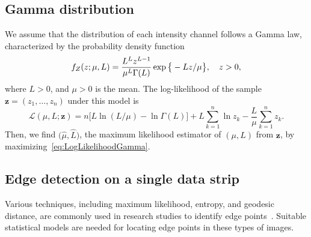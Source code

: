 \documentclass{article}
\begin{document}
\subsection{Gamma distribution}\vspace{-0.1cm}

We assume that the distribution of each intensity channel  follows a Gamma law, characterized by the probability density function
\vspace{-0.3cm}
\begin{equation}
f_Z(z;\mu,L)=\frac{L^{L}z^{L-1}}{\mu^{L}\Gamma(L)} \exp\big\{-Lz/\mu\big\},\quad z>0,
\label{func_dens_uni_gamma}\vspace{-0.2cm}
\end{equation}
where $L>0$, and
$\mu>0$ is the mean.
The log-likelihood of the sample $\bm{z} = (z_1,\dots,z_n)$ under this model is
\vspace{-0.3cm}
\begin{equation}
\mathcal{L}(\mu, L; \bm{z}) = 
n \big[L\ln (L / \mu) - \ln \Gamma(L)\big]
+L \sum_{k=1}^{n}\ln z_k -\frac{L}{\mu}\sum_{k=1}^{n} z_k.
\label{eq:LogLikelihoodGamma}
\end{equation}
Then, we find $\big(\widehat \mu, \widehat L\big)$, the maximum likelihood estimator of $(\mu, L)$ from $\bm{z}$, by maximizing~\eqref{eq:LogLikelihoodGamma}.
\subsection{Edge detection on a single data strip}\vspace{-0.1cm}
 
Various techniques, including maximum likelihood, entropy, and geodesic distance, are commonly used in research studies to identify edge points~\cite{NaranjoTorres2017,Nascimento2019}. 
Suitable statistical models are needed for locating edge points in these types of images.
\end{document}
